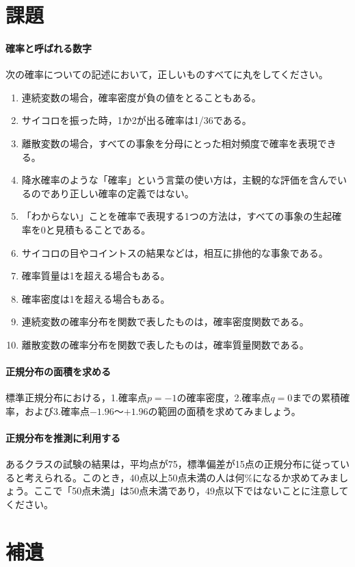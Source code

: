 \documentclass{ltjbook}
\begin{document}
\section{課題}
\paragraph{確率と呼ばれる数字}次の確率についての記述において，正しいものすべてに丸をしてください。

\begin{enumerate}
	\item 連続変数の場合，確率密度が負の値をとることもある。
	\item サイコロを振った時，1か2が出る確率は1/36である。
	\item 離散変数の場合，すべての事象を分母にとった相対頻度で確率を表現できる。
	\item 降水確率のような「確率」という言葉の使い方は，主観的な評価を含んでいるのであり正しい確率の定義ではない。
	\item 「わからない」ことを確率で表現する1つの方法は，すべての事象の生起確率を0と見積もることである。
	\item サイコロの目やコイントスの結果などは，相互に排他的な事象である。
	\item 確率質量は1を超える場合もある。
	\item 確率密度は1を超える場合もある。
	\item 連続変数の確率分布を関数で表したものは，確率密度関数である。
	\item 離散変数の確率分布を関数で表したものは，確率質量関数である。
\end{enumerate}

\paragraph{正規分布の面積を求める}標準正規分布における，1.確率点$p=-1$の確率密度，2.確率点$q=0$までの累積確率，および3.確率点$-1.96$〜$+1.96$の範囲の面積を求めてみましょう。
\paragraph{正規分布を推測に利用する}あるクラスの試験の結果は，平均点が75，標準偏差が15点の正規分布に従っていると考えられる。このとき，40点以上50点未満の人は何\%になるか求めてみましょう。ここで「50点未満」は50点未満であり，49点以下ではないことに注意してください。



\newpage
\section{補遺}
\end{document}

